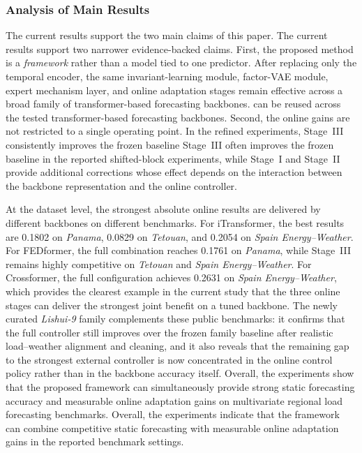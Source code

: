 ﻿\documentclass[journal]{IEEEtran}
\DeclareRobustCommand{\oldtext}[1]{{\color{revisionred}#1}}
\DeclareRobustCommand{\newtext}[1]{{\color{revisionblue}#1}}
\DeclareRobustCommand{\why}[1]{{\color{revisionblue}{\footnotesize (#1)}}}
\DeclareRobustCommand{\rw}[3]{\oldtext{#1} \newtext{#2}\why{#3}}
\begin{document}
\subsubsection{Analysis of Main Results}
\rw{The current results support the two main claims of this paper.}{The current results support two narrower evidence-backed claims.}{结论范围收窄。} First, the proposed method is a \emph{framework} rather than a model tied to one predictor. After replacing only the temporal encoder, the same invariant-learning module, factor-VAE module, expert mechanism layer, and online adaptation stages \rw{remain effective across a broad family of transformer-based forecasting backbones.}{can be reused across the tested transformer-based forecasting backbones.}{从效果断言改为可复用性事实。} Second, the online gains are not restricted to a single operating point. In the refined experiments, \rw{Stage~III consistently improves the frozen baseline}{Stage~III often improves the frozen baseline in the reported shifted-block experiments}{避免全称 consistent。}, while Stage~I and Stage~II provide additional corrections whose effect depends on the interaction between the backbone representation and the online controller.

At the dataset level, the strongest absolute online results are delivered by different backbones on different benchmarks. For iTransformer, the best results are 0.1802 on \textit{Panama}, 0.0829 on \textit{Tetouan}, and 0.2054 on \textit{Spain Energy--Weather}. For FEDformer, the full combination reaches 0.1761 on \textit{Panama}, while Stage~III remains highly competitive on \textit{Tetouan} and \textit{Spain Energy--Weather}. For Crossformer, the full configuration achieves 0.2631 on \textit{Spain Energy--Weather}, which provides the clearest example in the current study that the three online stages can deliver the strongest joint benefit on a tuned backbone. The newly curated \textit{Lishui-9} family complements these public benchmarks: it confirms that the full controller still improves over the frozen family baseline after realistic load--weather alignment and cleaning, and it also reveals that the remaining gap to the strongest external controller is now concentrated in the online control policy rather than in the backbone accuracy itself. \rw{Overall, the experiments show that the proposed framework can simultaneously provide strong static forecasting accuracy and measurable online adaptation gains on multivariate regional load forecasting benchmarks.}{Overall, the experiments indicate that the framework can combine competitive static forecasting with measurable online adaptation gains in the reported benchmark settings.}{删除 strong 和泛化过强结论。}
\end{document}
